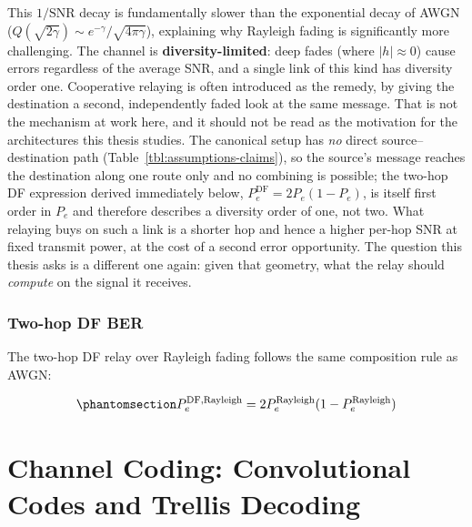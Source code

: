 This \(1/\text{SNR}\) decay is fundamentally slower than the exponential decay of AWGN (\(Q(\sqrt{2\gamma}) \sim e^{-\gamma}/\sqrt{4\pi\gamma}\)), explaining why Rayleigh fading is significantly more challenging. The channel is \textbf{diversity-limited}: deep fades (where \(|h| \approx 0\)) cause errors regardless of the average SNR, and a single link of this kind has diversity order one. Cooperative relaying is often introduced as the remedy, by giving the destination a second, independently faded look at the same message. That is not the mechanism at work here, and it should not be read as the motivation for the architectures this thesis studies. The canonical setup has \emph{no} direct source--destination path (Table~\ref{tbl:assumptions-claims}), so the source's message reaches the destination along one route only and no combining is possible; the two-hop DF expression derived immediately below, \(P_e^{\text{DF}} = 2P_e(1 - P_e)\), is itself first order in \(P_e\) and therefore describes a diversity order of one, not two. What relaying buys on such a link is a shorter hop and hence a higher per-hop SNR at fixed transmit power, at the cost of a second error opportunity. The question this thesis asks is a different one again: given that geometry, what the relay should \emph{compute} on the signal it receives.

\subsubsection{Two-hop DF BER}\label{sec:rayleigh-two-hop-df-ber}
The two-hop DF relay over Rayleigh fading follows the same composition rule as AWGN:

\begin{equation}\protect\phantomsection\label{eq:df-ber-rayleigh}{P_e^{\text{DF,Rayleigh}} = 2P_e^{\text{Rayleigh}}(1 - P_e^{\text{Rayleigh}})
}\end{equation}

\section{Channel Coding: Convolutional Codes and Trellis Decoding}\label{sec:channel-coding-convolutional-codes}

